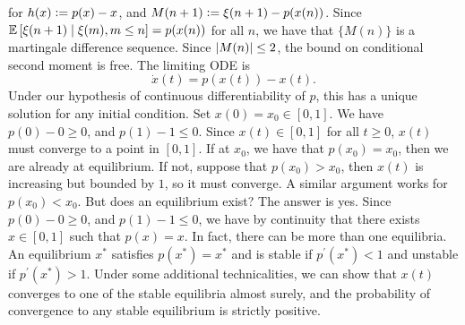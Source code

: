 for $h(x) \vcentcolon= p(x) - x$, and $M(n+1) \vcentcolon= \xi(n+1) - p(x(n))$. Since $\mathbb{E} \left[ \xi(n+1) \mid \xi(m), m \leq n \right] = p(x(n))$ for all $n$, we have that $\{M(n)\}$ is a martingale difference sequence. Since $\abs{M(n)} \leq 2$, the bound on conditional second moment is free. The limiting ODE is
\[
    \dot{x}(t) = p(x(t)) - x(t).
\]
Under our hypothesis of continuous differentiability of $p$, this has a unique solution for any initial condition. Set $x(0) = x_0 \in [0,1]$. We have $p(0) - 0 \geq 0$, and $p(1) - 1 \leq 0$. Since $x(t) \in [0,1]$ for all $t \geq 0$, $x(t)$ must converge to a point in $[0,1]$. If at $x_0$, we have that $p(x_0) = x_0$, then we are already at equilibrium. If not, suppose that $p(x_0) > x_0$, then $x(t)$ is increasing but bounded by $1$, so it must converge. A similar argument works for $p(x_0) < x_0$. But does an equilibrium exist? The answer is yes. Since $p(0) - 0 \geq 0$, and $p(1) - 1 \leq 0$, we have by continuity that there exists $x \in [0,1]$ such that $p(x) = x$. In fact, there can be more than one equilibria. An equilibrium $x^*$ satisfies $p(x^*) = x^*$ and is stable if $p^{\prime}(x^*) < 1$ and unstable if $p^{\prime}(x^*) > 1$. Under some additional technicalities, we can show that $x(t)$ converges to one of the stable equilibria almost surely, and the probability of convergence to any stable equilibrium is strictly positive. 
